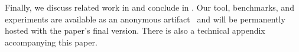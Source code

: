 Finally, we discuss related work in  and conclude in .
Our tool, benchmarks, and experiments are available as an anonymous artifact~\cite{ArtifactRepository} and will be permanently hosted with the paper’s final version. There is also a technical appendix accompanying this paper.